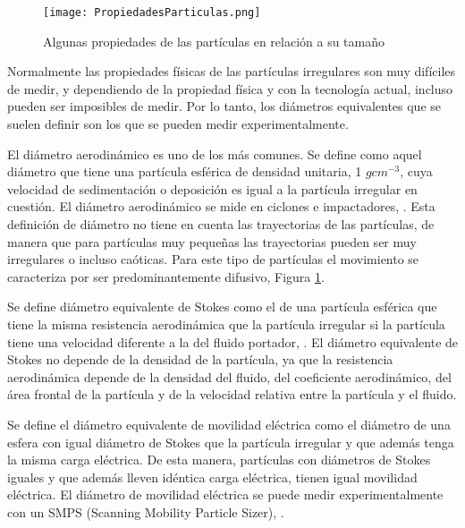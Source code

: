 \begin{figure}[ht]
\centering
	\texttt{[image: PropiedadesParticulas.png]}	 
	\caption{Algunas propiedades de las partículas en relación a su tamaño} \label{fig:propiedadesparticulas}
\end{figure} 

\par Normalmente las propiedades físicas de las partículas irregulares son muy difíciles de medir, y dependiendo de la propiedad física y con la tecnología actual, incluso pueden ser imposibles de medir. Por lo tanto, los diámetros equivalentes que se suelen definir son los que se pueden medir experimentalmente.

\par El diámetro aerodinámico es uno de los más comunes. Se define como aquel diámetro que tiene una partícula esférica de densidad unitaria, 1 $gcm^{-3}$, cuya velocidad de sedimentación o deposición es igual a la partícula irregular en cuestión. El diámetro aerodinámico se mide en ciclones e impactadores, \cite{smekensetal:1997}. Esta definición de diámetro no tiene en cuenta las trayectorias de las partículas, de manera que para partículas muy pequeñas las trayectorias pueden ser muy irregulares o incluso caóticas. Para este tipo de partículas el movimiento se caracteriza por ser predominantemente difusivo, Figura \ref{fig:propiedadesparticulas}. 

\par Se define diámetro equivalente de Stokes como el de una partícula esférica que tiene la misma resistencia aerodinámica que la partícula irregular si la partícula tiene una velocidad diferente a la del fluido portador, \cite{hinds:1982}. El diámetro equivalente de Stokes no depende de la densidad de la partícula, ya que la resistencia aerodinámica depende de la densidad del fluido, del coeficiente aerodinámico, del área frontal de la partícula y de la velocidad relativa entre la partícula y el fluido.

\par Se define el diámetro equivalente de movilidad eléctrica como el diámetro de una esfera con igual diámetro de Stokes que la partícula irregular y que además tenga la misma carga eléctrica. De esta manera, partículas con diámetros de Stokes iguales y que además lleven idéntica carga eléctrica, tienen igual movilidad eléctrica. El diámetro de movilidad eléctrica se puede medir experimentalmente con un SMPS (Scanning Mobility Particle Sizer), \cite{vangulijketal:2004}.

